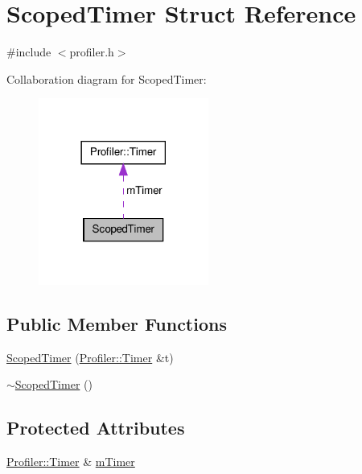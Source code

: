 \hypertarget{struct_scoped_timer}{\section{Scoped\-Timer Struct Reference}
\label{struct_scoped_timer}
}


{\ttfamily \#include $<$profiler.\-h$>$}



Collaboration diagram for Scoped\-Timer\-:\nopagebreak
\begin{figure}[H]
\begin{center}
\leavevmode
\includegraphics[width=158pt]{struct_scoped_timer__coll__graph}
\end{center}
\end{figure}
\subsection*{Public Member Functions}
\begin{DoxyCompactItemize}
\item 
\hyperlink{struct_scoped_timer_aaf97e129f9180b169494bec06fc52593}{Scoped\-Timer} (\hyperlink{struct_profiler_1_1_timer}{Profiler\-::\-Timer} \&t)
\item 
\hyperlink{struct_scoped_timer_a338ced0c8c39fe3d3e89e1b09d29f589}{$\sim$\-Scoped\-Timer} ()
\end{DoxyCompactItemize}
\subsection*{Protected Attributes}
\begin{DoxyCompactItemize}
\item 
\hyperlink{struct_profiler_1_1_timer}{Profiler\-::\-Timer} \& \hyperlink{struct_scoped_timer_a0442f61dabd3ac1d39e4da60c40a9708}{m\-Timer}
\end{DoxyCompactItemize}



